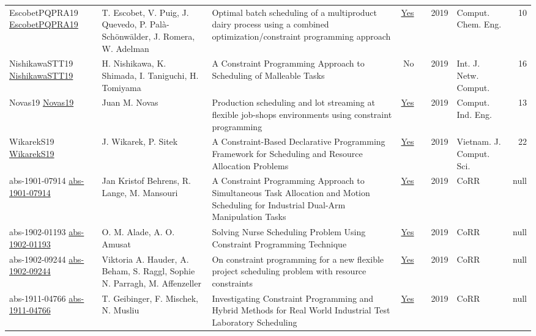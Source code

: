 {\begin{longtable}{p{3cm}p{6cm}p{7cm}rrrp{3cm}r}
EscobetPQPRA19 \href{https://doi.org/10.1016/j.compchemeng.2018.08.040}{EscobetPQPRA19} & T. Escobet, V. Puig, J. Quevedo, P. Pal{\`{a}}{-}Sch{\"{o}}nw{\"{a}}lder, J. Romera, W. Adelman & Optimal batch scheduling of a multiproduct dairy process using a combined optimization/constraint programming approach & \href{articles/EscobetPQPRA19.pdf}{Yes} & \cite{EscobetPQPRA19} & 2019 & Comput. Chem. Eng. & 10\\
NishikawaSTT19 \href{http://www.ijnc.org/index.php/ijnc/article/view/201}{NishikawaSTT19} & H. Nishikawa, K. Shimada, I. Taniguchi, H. Tomiyama & A Constraint Programming Approach to Scheduling of Malleable Tasks & No & \cite{NishikawaSTT19} & 2019 & Int. J. Netw. Comput. & 16\\
Novas19 \href{https://doi.org/10.1016/j.cie.2019.07.011}{Novas19} & Juan M. Novas & Production scheduling and lot streaming at flexible job-shops environments using constraint programming & \href{articles/Novas19.pdf}{Yes} & \cite{Novas19} & 2019 & Comput. Ind. Eng. & 13\\
WikarekS19 \href{https://doi.org/10.1142/S2196888819500027}{WikarekS19} & J. Wikarek, P. Sitek & A Constraint-Based Declarative Programming Framework for Scheduling and Resource Allocation Problems & \href{articles/WikarekS19.pdf}{Yes} & \cite{WikarekS19} & 2019 & Vietnam. J. Comput. Sci. & 22\\
abs-1901-07914 \href{http://arxiv.org/abs/1901.07914}{abs-1901-07914} & Jan Kristof Behrens, R. Lange, M. Mansouri & A Constraint Programming Approach to Simultaneous Task Allocation and Motion Scheduling for Industrial Dual-Arm Manipulation Tasks & \href{articles/abs-1901-07914.pdf}{Yes} & \cite{abs-1901-07914} & 2019 & CoRR & null\\
abs-1902-01193 \href{http://arxiv.org/abs/1902.01193}{abs-1902-01193} & O. M. Alade, A. O. Amusat & Solving Nurse Scheduling Problem Using Constraint Programming Technique & \href{articles/abs-1902-01193.pdf}{Yes} & \cite{abs-1902-01193} & 2019 & CoRR & null\\
abs-1902-09244 \href{http://arxiv.org/abs/1902.09244}{abs-1902-09244} & Viktoria A. Hauder, A. Beham, S. Raggl, Sophie N. Parragh, M. Affenzeller & On constraint programming for a new flexible project scheduling problem with resource constraints & \href{articles/abs-1902-09244.pdf}{Yes} & \cite{abs-1902-09244} & 2019 & CoRR & null\\
abs-1911-04766 \href{http://arxiv.org/abs/1911.04766}{abs-1911-04766} & T. Geibinger, F. Mischek, N. Musliu & Investigating Constraint Programming and Hybrid Methods for Real World Industrial Test Laboratory Scheduling & \href{articles/abs-1911-04766.pdf}{Yes} & \cite{abs-1911-04766} & 2019 & CoRR & null\\

\end{longtable}}
